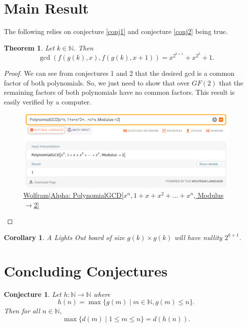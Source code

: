 \documentclass{article}
\newtheorem{theorem}{Theorem}
\newtheorem{corollary}{Corollary}
\newtheorem{conjecture}{Conjecture}
\newcommand{\N}{\mathbb{N}}
\begin{document}
	\section{Main Result}
	The following relies on conjecture \ref{conj1} and conjecture \ref{conj2} being true.
	\begin{theorem}
		Let $k \in \N$.
		Then
		\begin{equation*}
			\gcd\left(f(g(k),x),f(g(k),x+1)\right) = x^{2^{k+1}} + x^{2^k} + 1.
		\end{equation*}
	\end{theorem}
	\begin{proof}
		We can see from conjectures 1 and 2 that the desired gcd is a common factor of both polynomials.
		So, we just need to show that over $GF(2)$ that the remaining factors of both polynomials have no common factors.
		This result is easily verified by a computer.
		
		\begin{figure}[H]
			\centering
			\includegraphics[width=.8\textwidth]{wolfram_result.png}
			\caption{\href{https://www.wolframalpha.com/input/?i=PolynomialGCD\%5Bx\%5En\%2C+1\%2Bx\%2Bx\%5E2\%2B...\%2Bx\%5En\%2C+Modulus-\%3E2\%5D}{Wolfram|Alpha: PolynomialGCD[$x^n, 1+x+x^2+...+x^n$, Modulus$\to$2]}}
		\end{figure}
	\end{proof}

	\begin{corollary}
		A \textit{Lights Out} board of size $g(k) \times g(k)$ will have nullity $2^{k+1}$.
	\end{corollary}
	
	\section{Concluding Conjectures}
	\begin{conjecture}
		\label{conj3}
		Let $h: \N \to \N$ where
		\begin{equation*}
			h(n) = \max \{g(m) \mid m \in \N, g(m) \leq n\}.
		\end{equation*}
		Then for all $n \in \N$,
		\begin{equation*}
			\max \{d(m) \mid 1 \leq m \leq n\} = d(h(n)).
		\end{equation*}
	\end{conjecture}
	
\end{document}
